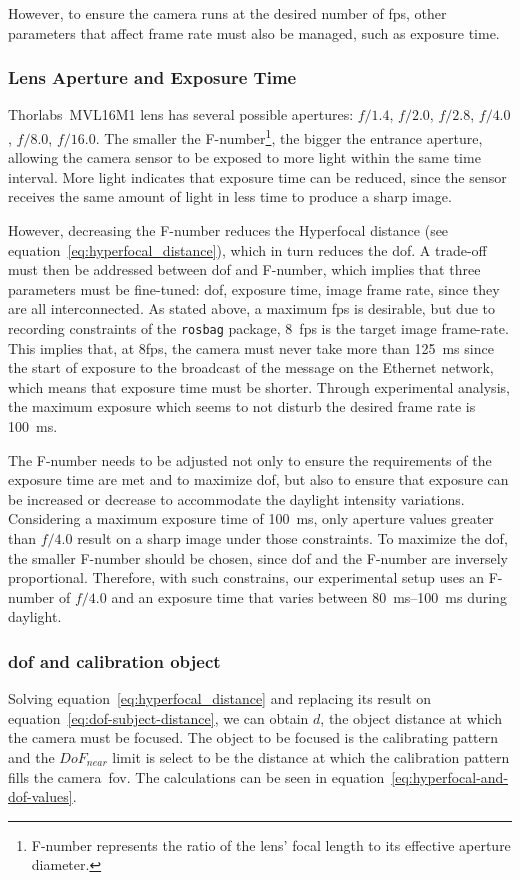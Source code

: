 However, to ensure the camera runs at the desired number of \ac{fps}, other parameters that affect frame rate must also be managed, such as exposure time.


\subsubsection{Lens Aperture and Exposure Time}
Thorlabs\cp~MVL16M1 lens has several possible apertures: $f/1.4$, $f/2.0$, $f/2.8$, $f/4.0$, $f/8.0$, $f/16.0$. The smaller the F-number\footnote{F-number represents the ratio of the lens' focal length to its effective aperture diameter.}, the bigger the entrance aperture, allowing the camera sensor to be exposed to more light within the same time interval. More light indicates that exposure time can be reduced, since the sensor receives the same amount of light in less time  to produce a sharp image.

However, decreasing the F-number reduces the Hyperfocal distance (see equation~\eqref{eq:hyperfocal_distance}), which in turn reduces the \acf{dof}. A trade-off must then be addressed between \ac{dof} and F-number, which implies that three parameters must be fine-tuned: \ac{dof}, exposure time, image frame rate, since they are all interconnected. As stated above, a maximum \ac{fps} is desirable, but due to recording constraints of the \texttt{rosbag} package, $8$~\ac{fps} is the target image frame-rate. This implies that, at $8$\ac{fps}, the camera must never take more than \SI{125}{\milli\second} since the start of exposure to the broadcast of the message on the Ethernet network, which means that exposure time must be shorter. Through experimental analysis, the maximum exposure which seems to not disturb the desired frame rate is \SI{100}{\milli\second}. 

The F-number needs to be adjusted not only to ensure the requirements of the exposure time are met and to maximize \acl{dof}, but also to ensure that exposure can be increased or decrease to accommodate the daylight intensity variations. Considering a maximum exposure time of \SI{100}{\milli\second}, only aperture values greater than $f/4.0$ result on a sharp image under those constraints. To maximize the \ac{dof}, the smaller F-number should be chosen, since \ac{dof} and the F-number are inversely proportional. Therefore, with such constrains, our experimental setup uses an F-number of $f/4.0$ and an exposure time that varies between \SIrange{80}{100}{\milli\second} during daylight.

\subsubsection{\acl{dof} and calibration object}
\label{subsec:calibration:dof-and-calibration-object}
Solving equation~\eqref{eq:hyperfocal_distance} and replacing its result on equation~\eqref{eq:dof-subject-distance}, we can obtain $d$, the object distance at which the camera must be focused. The object to be focused is the calibrating pattern and the $DoF_{near}$ limit is select to be the distance at which the calibration pattern fills the camera~\ac{fov}. The calculations can be seen in equation~\eqref{eq:hyperfocal-and-dof-values}.

